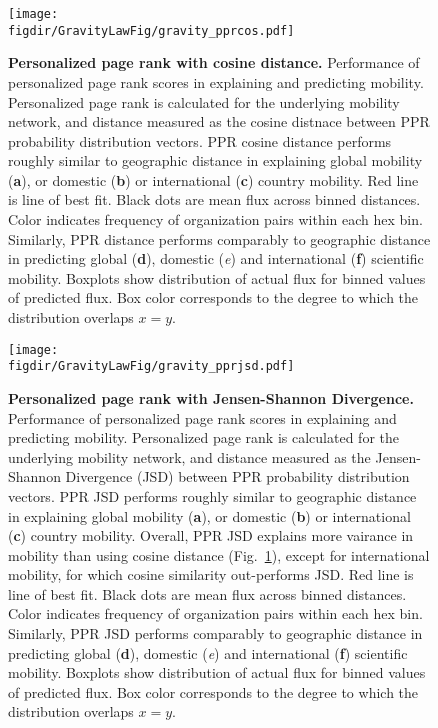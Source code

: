 \documentclass[12pt]{article} %
\def\figdir{../Figs}
\begin{document}
%
%
\begin{figure}[p!]
	\centering
	\texttt{[image: \\figdir/GravityLawFig/gravity\_pprcos.pdf]}
	\caption{
		\textbf{Personalized page rank with cosine distance.}
		Performance of personalized page rank scores in explaining and predicting mobility.
		Personalized page rank is calculated for the underlying mobility network, and distance measured as the cosine distnace between PPR probability distribution vectors.
		PPR cosine distance performs roughly similar to geographic distance in explaining global mobility (\textbf{a}), or domestic (\textbf{b}) or international (\textbf{c}) country mobility.
		Red line is line of best fit.
		Black dots are mean flux across binned distances.
		Color indicates frequency of organization pairs within each hex bin.
		Similarly, PPR distance performs comparably to geographic distance in predicting global (\textbf{d}), domestic (\textit{e}) and international (\textbf{f}) scientific mobility.
		Boxplots show distribution of actual flux for binned values of predicted flux.
		Box color corresponds to the degree to which the distribution overlaps $x = y$.
	}
	\label{fig:supp:gravity_pprcos}
\end{figure}


%
%

\begin{figure}[p!]
	\centering
	\texttt{[image: \\figdir/GravityLawFig/gravity\_pprjsd.pdf]}
	\caption{
		\textbf{Personalized page rank with Jensen-Shannon Divergence.}
		Performance of personalized page rank scores in explaining and predicting mobility.
		Personalized page rank is calculated for the underlying mobility network, and distance measured as the Jensen-Shannon Divergence (JSD) between PPR probability distribution vectors.
		PPR JSD performs roughly similar to geographic distance in explaining global mobility (\textbf{a}), or domestic (\textbf{b}) or international (\textbf{c}) country mobility.
		Overall, PPR JSD explains more vairance in mobility than using cosine distance (Fig.~\ref{fig:supp:gravity_pprcos}), except for international mobility, for which cosine similarity out-performs JSD.
		Red line is line of best fit.
		Black dots are mean flux across binned distances.
		Color indicates frequency of organization pairs within each hex bin.
		Similarly, PPR JSD performs comparably to geographic distance in predicting global (\textbf{d}), domestic (\textit{e}) and international (\textbf{f}) scientific mobility.
		Boxplots show distribution of actual flux for binned values of predicted flux.
		Box color corresponds to the degree to which the distribution overlaps $x = y$.
	}
	\label{fig:supp:gravity_pprjsd}
\end{figure}
\end{document}
